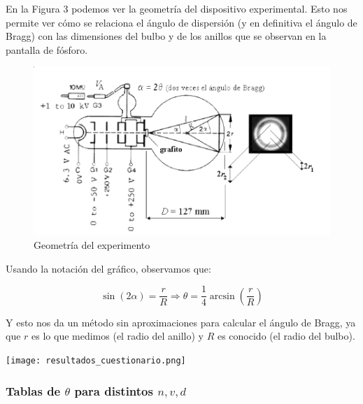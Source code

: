 \documentclass[]{article}
\begin{document}
En la Figura 3 podemos ver la geometría del dispositivo experimental.
Esto nos permite ver cómo se relaciona el ángulo de dispersión (y en
definitiva el ángulo de Bragg) con las dimensiones del bulbo y de los
anillos que se observan en la pantalla de fósforo.

\begin{figure}[H]
\centering
\includegraphics{geometria_experimento.png}
\caption{Geometría del experimento}
\end{figure}

Usando la notación del gráfico, observamos que:

\[\sin (2\alpha) = \frac{r}{R} \Rightarrow \theta = \frac{1}{4}
\arcsin\left (\frac{r}{R} \right )\]

Y esto nos da un método sin aproximaciones para calcular el ángulo de
Bragg, ya que \(r\) es lo que medimos (el radio del anillo) y \(R\) es
conocido (el radio del bulbo).

\texttt{[image: resultados\_cuestionario.png]}

\hypertarget{tablas-de-theta-para-distintos-n-v-d}{%
\subsubsection{\texorpdfstring{Tablas de \(\theta\) para distintos
\(n, v, d\)}{Tablas de \textbackslash{}theta para distintos n, v, d}}\label{tablas-de-theta-para-distintos-n-v-d}}
\end{document}
